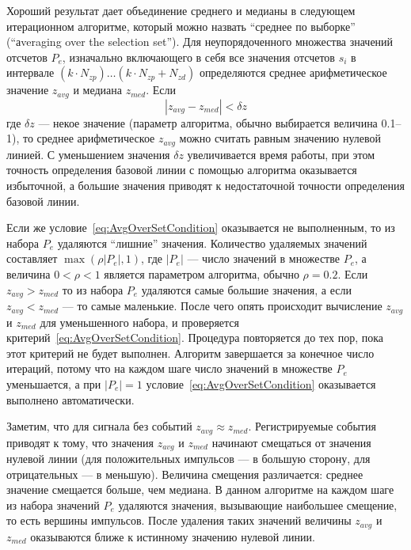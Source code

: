 Хороший результат дает объединение среднего и медианы в следующем итерационном алгоритме, который можно назвать ``среднее по выборке'' (``аveraging over the selection set''). Для неупорядоченного множества значений отсчетов $P_e$, изначально включающего в себя все значения отсчетов $s_i$ в интервале $(k \cdot N_{zp}) \ldots (k \cdot N_{zp} + N_{zd})$ определяются среднее арифметическое значение $z_{avg}$ и медиана $z_{med}$. Если 
\begin{equation}
  \label{eq:AvgOverSetCondition}
  | z_{avg} - z_{med} | < \delta z
\end{equation}
где $\delta z$ --- некое значение (параметр алгоритма, обычно выбирается величина 0.1--1), то среднее арифметическое $z_{avg}$ можно считать равным значению нулевой линией. С уменьшением значения $\delta z$ увеличивается время работы, при этом точность определения базовой линии с помощью алгоритма оказывается избыточной, а большие значения приводят к недостаточной точности определения базовой линии.~\cite{Khilkevitch2020} 

Если же условие~\ref{eq:AvgOverSetCondition} оказывается не выполненным, то из набора $P_e$ удаляются ``лишние'' значения. Количество удаляемых значений составляет $\max( \rho |P_e|, 1 )$, где $|P_e|$ --- число значений в множестве $P_e$, а величина $0 < \rho < 1$ является параметром алгоритма, обычно $\rho = 0.2$. Если $z_{avg} > z_{med}$ то из набора $P_e$ удаляются самые большие значения, а если  $z_{avg} < z_{med}$ --- то самые маленькие. После чего опять происходит вычисление $z_{avg}$ и $z_{med}$ для уменьшенного набора, и проверяется критерий~\ref{eq:AvgOverSetCondition}. Процедура повторяется до тех пор, пока этот критерий не будет выполнен. Алгоритм завершается за конечное число итераций, потому что на каждом шаге число значений в множестве $P_e$ уменьшается, а при $|P_e| = 1$ условие~\ref{eq:AvgOverSetCondition} оказывается выполнено автоматически. \cite{Khilkevitch2020}

Заметим, что для сигнала без событий $z_{avg} \approx z_{med}$. Регистрируемые события приводят к тому, что значения $z_{avg}$ и $z_{med}$ начинают смещаться от значения нулевой линии (для положительных импульсов --- в большую сторону, для отрицательных --- в меньшую). Величина смещения различается: среднее значение смещается больше, чем медиана. В данном алгоритме на каждом шаге из набора значений $P_e$ удаляются значения, вызывающие наибольшее смещение, то есть вершины импульсов. После удаления таких значений величины $z_{avg}$ и $z_{med}$ оказываются ближе к истинному значению нулевой линии. 

